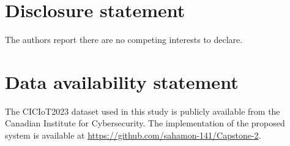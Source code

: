 \documentclass[]{interact}
\theoremstyle{plain}%
\theoremstyle{definition}
\theoremstyle{remark}
\begin{document}
\section*{Disclosure statement}
The authors report there are no competing interests to declare.

\section*{Data availability statement}
The CICIoT2023 dataset used in this study is publicly available from the Canadian Institute for Cybersecurity. The implementation of the proposed system is available at \url{https://github.com/sahamon-141/Capstone-2}.



\end{document}
